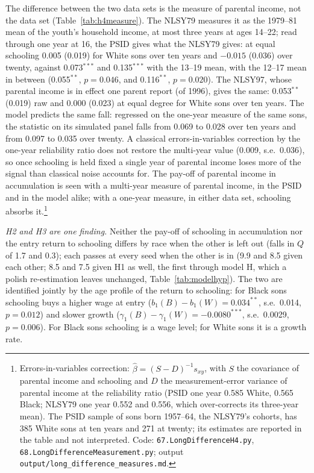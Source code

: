 The difference between the two data sets is the measure of parental income, not the data set
(Table~\ref{tab:h4measure}). The NLSY79 measures it as the 1979--81 mean of the youth's household income, at most three
years at ages 14--22; read through one year at 16, the PSID gives what the NLSY79 gives: at equal schooling 0.005
(0.019) for White sons over ten years and $-0.015$ (0.036) over twenty, against 0.073$^{***}$ and 0.135$^{***}$ with the
13--19 mean, with the 12--17 mean in between (0.055$^{**}$, $p = 0.046$, and 0.116$^{**}$, $p = 0.020$). The NLSY97,
whose parental income is in effect one parent report (of 1996), gives the same: 0.053$^{**}$ (0.019) raw and 0.000
(0.023) at equal degree for White sons over ten years. The model predicts
the same fall: regressed on the one-year measure of the same sons, the statistic on its simulated panel falls from 0.069
to 0.028 over ten years and from 0.097 to 0.035 over twenty. A classical errors-in-variables correction by the one-year
reliability ratio does not restore the multi-year value (0.009, s.e.\ 0.036), so once schooling is held fixed a single
year of parental income loses more of the signal than classical noise accounts for. The pay-off of parental income in
accumulation is seen with a multi-year measure of parental income, in the PSID and in the model alike; with a one-year
measure, in either data set, schooling absorbs it.\footnote{Errors-in-variables correction: $\hat\beta = (S - D)^{-1}
s_{xy}$, with $S$ the covariance of parental income and schooling and $D$ the measurement-error variance of parental
income at the reliability ratio (PSID one year 0.585 White, 0.565 Black; NLSY79 one year 0.552 and 0.556, which
over-corrects its three-year mean). The PSID sample of sons born 1957--64, the NLSY79's cohorts, has 385 White
sons at ten years and 271 at twenty; its estimates are reported in the table and not interpreted. Code:
\texttt{67.LongDifferenceH4.py}, \texttt{68.LongDifferenceMeasurement.py}; output
\texttt{output/long\_difference\_measures.md}.}

\textit{H2 and H3 are one finding.} Neither the pay-off of schooling in accumulation nor the entry return to schooling
differs by race when the other is left out (falls in $Q$ of 1.7 and 0.3); each passes at every seed when the other is in
(9.9 and 8.5 given each other; 8.5 and 7.5 given H1 as well, the first through model H, which a polish re-estimation
leaves unchanged, Table~\ref{tab:modelhyp}). The two are identified jointly by the age profile of the
return to schooling: for Black sons schooling buys a higher wage at entry ($b_1(B) - b_1(W) = 0.034^{**}$, s.e.\ 0.014,
$p = 0.012$) and slower growth ($\gamma_1(B) - \gamma_1(W) = -0.0080^{***}$, s.e.\ 0.0029, $p = 0.006$). For Black sons
schooling is a wage level; for White sons it is a growth rate.

